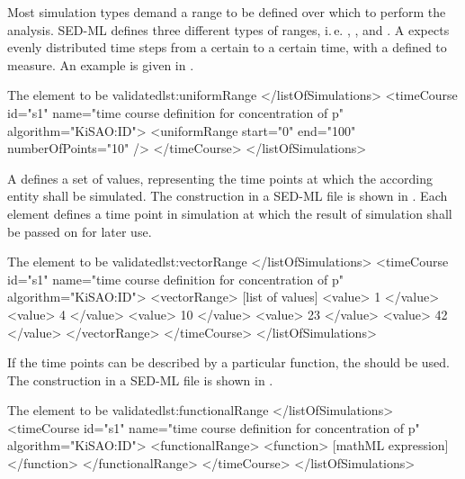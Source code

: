 \label{sec:range}
Most simulation types demand a range to be defined over which to perform the analysis. SED-ML defines three different types of ranges, i.\,e. , , and .
A  expects evenly distributed time steps from a certain  to a certain  time, with a defined  to measure. An example is given in . %
\begin{myXmlLst}{The  element \alert{to be validated}}{lst:uniformRange}
</listOfSimulations>
 <timeCourse id="s1" name="time course definition for concentration of p" algorithm="KiSAO:ID">
  <uniformRange start="0" end="100" numberOfPoints="10" />
 </timeCourse>
</listOfSimulations>
\end{myXmlLst}


A  defines a set of values, representing the time points at which the according entity shall be simulated. %
The construction in a SED-ML file is shown in . Each  element defines a time point in simulation at which the result of simulation shall be passed on for later use.
%
\begin{myXmlLst}{The  element \alert{to be validated}}{lst:vectorRange}
</listOfSimulations>
 <timeCourse id="s1" name="time course definition for concentration of p" algorithm="KiSAO:ID">
  <vectorRange>
   [list of values]
   <value> 1  </value>
   <value> 4  </value>  
   <value> 10 </value>
   <value> 23 </value>
   <value> 42 </value>
  </vectorRange>
 </timeCourse>
</listOfSimulations>
\end{myXmlLst}

If the time points can be described by a particular function, the  should be used. The construction in a SED-ML file is shown in .
\begin{myXmlLst}{The  element \alert{to be validated}}{lst:functionalRange}
</listOfSimulations>
 <timeCourse id="s1" name="time course definition for concentration of p" algorithm="KiSAO:ID">
  <functionalRange>
   <function>
    [mathML expression]
   </function>
  </functionalRange>
 </timeCourse>
</listOfSimulations>
\end{myXmlLst}


